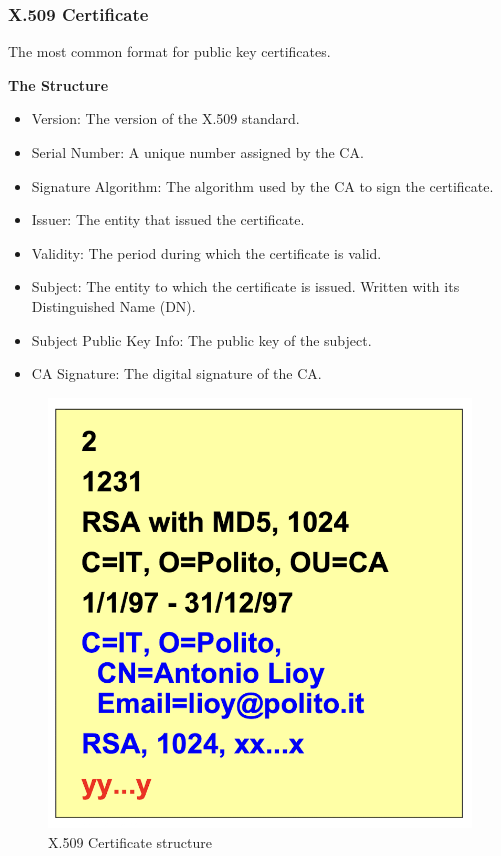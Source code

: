 \clearpage 
\subsubsection{X.509 Certificate}
\begin{center}
    The most common format for public key certificates.
\end{center}
\begin{center}
    \textbf{The Structure}
\end{center}

\begin{multicols}{2}

    \begin{itemize}
        \item Version: The version of the X.509 standard.
        \item Serial Number: A unique number assigned by the CA.
        \item Signature Algorithm: The algorithm used by the CA to sign the certificate.
        \item Issuer: The entity that issued the certificate.
        \item Validity: The period during which the certificate is valid.
        \item Subject: The entity to which the certificate is issued. Written with its Distinguished Name (DN).
        \item Subject Public Key Info: The public key of the subject.
        \item CA Signature: The digital signature of the CA.
    \end{itemize}

\columnbreak

    \begin{figure}[H]
        \centering
        \includegraphics[width=\linewidth]{Images/Cryptography/x509.png}
        \caption{X.509 Certificate structure}
    \end{figure}
\end{multicols}

